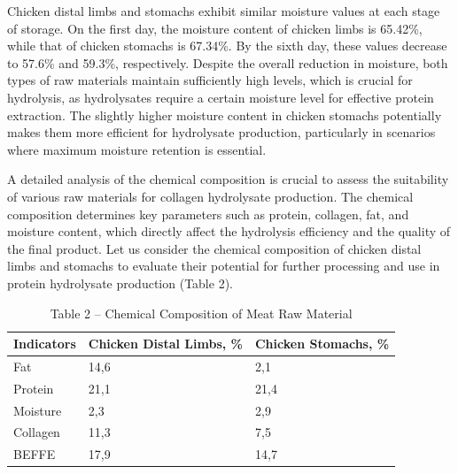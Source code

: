 \begin{multicols}{2}
Chicken distal limbs and stomachs exhibit similar moisture values at
each stage of storage. On the first day, the moisture content of chicken
limbs is 65.42\%, while that of chicken stomachs is 67.34\%. By the
sixth day, these values decrease to 57.6\% and 59.3\%, respectively.
Despite the overall reduction in moisture, both types of raw materials
maintain sufficiently high levels, which is crucial for hydrolysis, as
hydrolysates require a certain moisture level for effective protein
extraction. The slightly higher moisture content in chicken stomachs
potentially makes them more efficient for hydrolysate production,
particularly in scenarios where maximum moisture retention is essential.

A detailed analysis of the chemical composition is crucial to assess the
suitability of various raw materials for collagen hydrolysate
production. The chemical composition determines key parameters such as
protein, collagen, fat, and moisture content, which directly affect the
hydrolysis efficiency and the quality of the final product. Let us
consider the chemical composition of chicken distal limbs and stomachs
to evaluate their potential for further processing and use in protein
hydrolysate production (Table 2).
\end{multicols}

\begin{table}[H]
\caption*{Table 2 -- Chemical Composition of Meat Raw Material}
\centering
\begin{tabular}{|l|l|l|}
\hline
Indicators & Chicken Distal Limbs, \% & Chicken Stomachs, \% \\ \hline
Fat        & 14,6                     & 2,1                  \\ \hline
Protein    & 21,1                     & 21,4                 \\ \hline
Moisture   & 2,3                      & 2,9                  \\ \hline
Collagen   & 11,3                     & 7,5                  \\ \hline
BEFFE      & 17,9                     & 14,7                 \\ \hline
\end{tabular}
\end{table}

